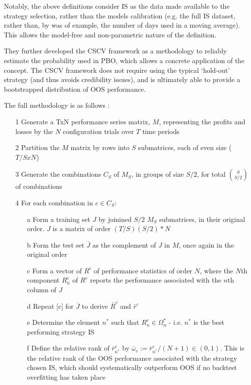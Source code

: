 \documentclass[a4paper,latin]{paper}
\begin{document}
Notably, the above definitions consider IS as the data made available to the strategy selection, rather than the 
models calibration (e.g. the full IS dataset, rather than, by was of example, the number of days used in a moving average). 
This allows the model-free and non-parametric nature of the definition. 
\hfill \break 

They further developed the CSCV framework as a methodology to reliably estimate the probability used in PBO, which allows a concrete application of the concept. The CSCV framework does not require using the typical ‘hold-out’ strategy (and thus avoids credibility issues), and is ultimately able to provide a bootstrapped distribution of OOS performance. 
\hfill \break 

The full methodology is as follows \cite{BailyPBO}:
\begin{itemize}
	\item[1]Generate a TxN performance series matrix, $M$, representing the profits and losses by the $N$ configuration trials over $T$ time periods
	\item[2]Partition the $M$ matrix by rows into $S$ submatrices, each of even size ($T/S x N$)
	\item[3]Generate the combinations $C_S$ of $M_S$, in groups of size $S/2$, for total $\binom{S}{S/2}$ of combinations
	\item[4]For each combination in $c \in C_S$:
	\begin{itemize}
		\item [a] Form a training set $J$ by joinined $S/2$ $M_S$ submatrices, in their original order. $J$ is a matrix of order $(T/S)(S/2)*N $
		\item [b] Form the test set $\bar{J}$ as the complement of $J$ in $M$, once again in the original order
		\item [c] Form a vector of $R^c$ of performance statistics of order $N$, where the $N$th component $R_n^c$ of $R^c$ reports the performance associated with the $n$th column of $J$
		\item [d] Repeat [c] for $\bar{J}$ to derive $\bar{R}^c$ and $\bar{r}^c$
		\item [e] Determine the element $n^*$ such that $R^c_n \in \Omega^*_n$ - i.e. $n^*$ is the best performing strategy IS
		\item [f] Define the relative rank of $\bar{r}^c_{n^*}$ by $\bar{\omega}_c := \bar{r}^c_{n^*} / (N +1) \in (0,1)$. This is the relative rank of the OOS performance associated with the strategy chosen IS, which should systematically outperform OOS if no backtest overfitting has taken place

\end{itemize}
\end{itemize}
\end{document}
